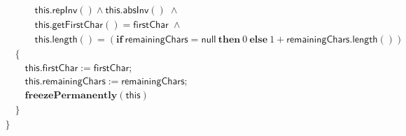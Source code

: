 \documentclass{article}
\begin{document}
$$\begin{array}{l}
\quad\quad\quad \mathsf{this}.\mathsf{repInv}() \land \mathsf{this}.\mathsf{absInv}()\; \land\\
\quad\quad\quad \mathsf{this}.\mathsf{getFirstChar}() = \mathsf{firstChar}\; \land\\
\quad\quad\quad \mathsf{this}.\mathsf{length}() = (\mathbf{if}\ \mathsf{remainingChars} = \mathsf{null}\ \mathbf{then}\ 0\ \mathbf{else}\ 1 + \mathsf{remainingChars}.\mathsf{length}())\\
\quad \{\\
\quad\quad \mathsf{this}.\mathsf{firstChar} := \mathsf{firstChar};\\
\quad\quad \mathsf{this}.\mathsf{remainingChars} := \mathsf{remainingChars};\\
\quad\quad \mathbf{freezePermanently}(\mathsf{this})\\
\quad \}\\
\}
\end{array}$$
\end{document}
